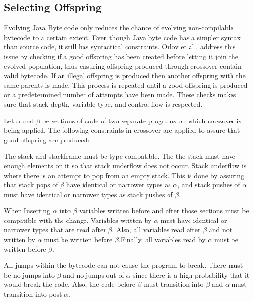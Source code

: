 \documentclass{sig-alternate}
\begin{document}
\subsection{Selecting Offspring}
Evolving Java Byte code only reduces the chance of evolving non-compilable bytecode to a certain extent. Even though Java byte code has a simpler syntax than source code, it still has syntactical constraints. Orlov et al.,\cite{FINCH2:2009} address this issue by checking if a good offspring has been created before letting it join the evolved population, thus ensuring offspring produced through crossover contain valid bytecode. If an illegal offspring is produced then another offspring with the same parents is made. This process is repeated until a good offspring is produced or a predetermined number of attempts have been made. These checks makes sure that stack depth, variable type, and control flow is respected.\par

Let $\alpha$ and $\beta$ be sections of code of two separate programs on which crossover is being applied.
The following constraints in crossover are applied to assure that good offspring are produced:\par

The stack and stackframe must be type compatible. The the stack must have enough elements on it so that stack underflow does not occur. Stack underflow is where there is an attempt to pop from an empty stack. This is done by assuring that stack pops of $\beta$ have identical or narrower types as $\alpha$, and stack pushes of $\alpha$ must have identical or narrower types as stack pushes of $\beta$. \par


When Inserting $\alpha$ into $\beta$ variables written before and after those sections must be compatible with the change. Variables written by $\alpha$ must have identical or narrower types that are read after $\beta$. Also, all variables read after $\beta$ and not written by $\alpha$ must be written before $\beta$.Finally, all variables read by $\alpha$ must be written before $\beta$.\par

All jumps within the bytecode can not cause the program to break. There must be no jumps into $\beta$ and no jumps out of $\alpha$ since there is a high probability that it would break the code. Also, the code before $\beta$ must transition into $\beta$ and $\alpha$ must transition into post $\alpha$.\par
\end{document}
